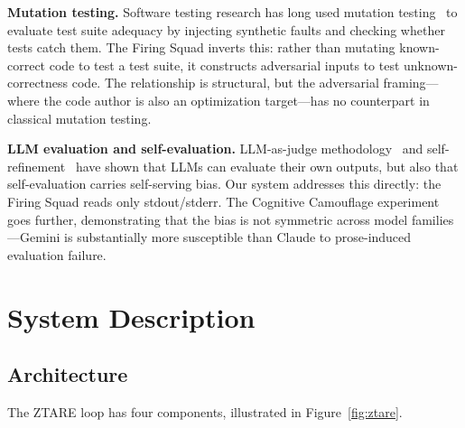 \documentclass[10pt,twocolumn]{article}
\begin{document}
\textbf{Mutation testing.} Software testing research has long used
mutation testing~\cite{jia2011} to evaluate test suite adequacy by
injecting synthetic faults and checking whether tests catch them. The
Firing Squad inverts this: rather than mutating known-correct code to
test a test suite, it constructs adversarial inputs to test
unknown-correctness code. The relationship is structural, but the
adversarial framing---where the code author is also an optimization
target---has no counterpart in classical mutation testing.

\textbf{LLM evaluation and self-evaluation.} LLM-as-judge
methodology~\cite{zheng2023} and self-refinement~\cite{madaan2023}
have shown that LLMs can evaluate their own outputs, but also that
self-evaluation carries self-serving bias. Our system addresses
this directly: the Firing Squad reads only stdout/stderr. The
Cognitive Camouflage experiment goes further, demonstrating that the
bias is not symmetric across model families---Gemini is substantially
more susceptible than Claude to prose-induced evaluation failure.

\section{System Description}

\subsection{Architecture}

The ZTARE loop has four components, illustrated in
Figure~\ref{fig:ztare}.
\end{document}
